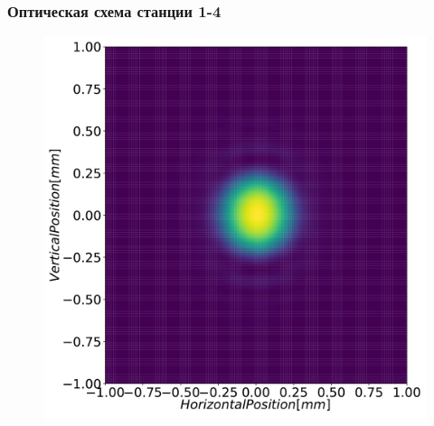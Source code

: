 \documentclass[14pt, hyperref = {colorlinks},xcolor=table ]{beamer}
\begin{document}
\small
\begin{frame}
\frametitle{Оптическая схема станции 1-4}\label{t1}
\vspace{-10pt}
\begin{figure}[h]
	\vspace{10pt}	

	\begin{minipage}[h]{0.32\linewidth}
		\raggedright{\includegraphics[width=0.99\linewidth]{pic/3_harm_before_optics_2d.pdf}}
	\end{minipage}
	\begin{minipage}[h]{0.32\linewidth}

\end{minipage}
\end{figure}
\end{frame}
\end{document}
